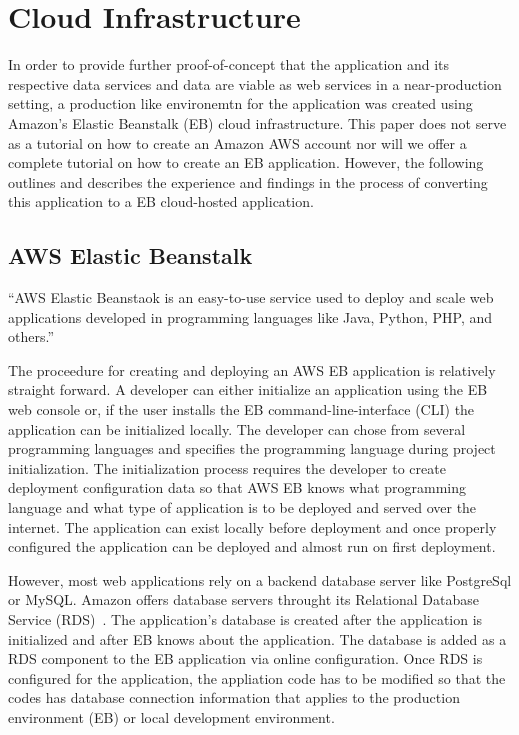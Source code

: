 \section{Cloud Infrastructure}
In order to provide further proof-of-concept that the application and its 
respective data services and data are viable as web services in a 
near-production setting, a production like environemtn for the application 
was created using Amazon's Elastic Beanstalk (EB) cloud infrastructure.  This 
paper does not serve as a tutorial on how to create an Amazon AWS account nor 
will we offer a complete tutorial on how to create an EB application.  
However, the following outlines and describes the experience and findings in 
the process of converting this application to a EB cloud-hosted application.

\subsection{AWS Elastic Beanstalk}
``AWS Elastic Beanstaok is an easy-to-use service used to deploy and scale web 
applications developed in programming languages like Java, Python, PHP, and 
others.''\cite{AWSEB2018}

The proceedure for creating and deploying an AWS EB application is relatively 
straight forward.  A developer can either initialize an application using the 
EB web console or, if the user installs the EB command-line-interface (CLI) 
the application can be initialized locally.  The developer can chose from 
several programming languages and specifies the programming language during 
project initialization.  The initialization process requires the developer to 
create deployment configuration data so that AWS EB knows what programming 
language and what type of application is to be deployed and served over the 
internet.  The application can exist locally before deployment and once 
properly  configured the application can be deployed and almost run on first 
deployment.  

However, most web applications rely on a backend database server like 
PostgreSql or MySQL.  Amazon offers database servers throught its 
Relational Database Service (RDS)~\cite{RDS2018}.  The application's 
database is created after the application is initialized and after EB knows 
about the application.  The database is added as a RDS component to the EB 
application via online configuration.  Once RDS is configured for the 
application, the appliation code has to be modified so that the codes has 
database connection information that applies to the production environment 
(EB) or local development environment.

